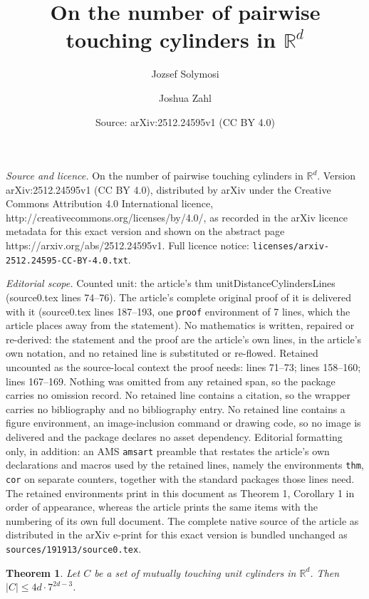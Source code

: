 \documentclass[10pt,a4paper]{amsart}
\title{On the number of pairwise touching cylinders in $\mathbb{R}^d$}
\author{Jozsef Solymosi \and Joshua Zahl}
\date{Source: arXiv:2512.24595v1 (CC BY 4.0)}
\newtheorem{thm}{Theorem}
\newcommand{\RR}{\mathbb{R}}
\begin{document}
\maketitle

\noindent\emph{Source and licence.} On the number of pairwise touching cylinders in $\mathbb{R}^d$. Version arXiv:2512.24595v1 (CC BY 4.0), distributed by arXiv under the Creative Commons Attribution 4.0 International licence, http://creativecommons.org/licenses/by/4.0/, as recorded in the arXiv licence metadata for this exact version and shown on the abstract page https://arxiv.org/abs/2512.24595v1. Full licence notice: \texttt{licenses/arxiv-2512.24595-CC-BY-4.0.txt}.\par\smallskip

\noindent\textit{Editorial scope.} Counted unit: the article's thm unitDistanceCylindersLines (source0.tex lines 74--76). The article's complete original proof of it is delivered with it (source0.tex lines 187--193, one \texttt{proof} environment of 7 lines, which the article places away from the statement). No mathematics is written, repaired or re-derived: the statement and the proof are the article's own lines, in the article's own notation, and no retained line is substituted or re-flowed.  Retained uncounted as the source-local context the proof needs: lines 71--73; lines 158--160; lines 167--169.  Nothing was omitted from any retained span, so the package carries no omission record.  No retained line contains a citation, so the wrapper carries no bibliography and no bibliography entry.  No retained line contains a figure environment, an image-inclusion command or drawing code, so no image is delivered and the package declares no asset dependency.  Editorial formatting only, in addition: an AMS \texttt{amsart} preamble that restates the article's own declarations and macros used by the retained lines, namely the environments \texttt{thm}, \texttt{cor} on separate counters, together with the standard packages those lines need.  The retained environments print in this document as Theorem 1, Corollary 1 in order of appearance, whereas the article prints the same items with the numbering of its own full document.  The complete native source of the article as distributed in the arXiv e-print for this exact version is bundled unchanged as \texttt{sources/191913/source0.tex}.
\begin{thm}\label{unitDistanceLines}
Let $C$ be a set of mutually touching unit cylinders in $\RR^d$. Then $|C|\leq 4d\cdot 7^{2d-3}$.
\end{thm}
\end{document}
